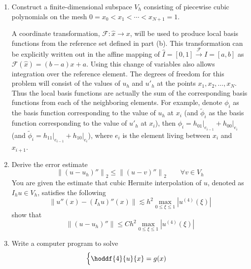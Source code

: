 \documentclass{article}
\newcommand\NoIndent[1]{%
  \begingroup
  \par
  \parshape0
  #1\par
  \endgroup
}
\begin{document}
\begin{enumerate}
\begin{enumerate}
{\begin{table}[h]
\begin{tabular}{c|c}
		\hline
		\end{tabular}
	\end{table}
}
			\item Construct a finite-dimensional subspace $V_h$ consisting of
				piecewise cubic polynomials on the mesh $0 = x_0 < x_1 < \cdots < x_{N+1} = 1$.
\NoIndent{
	A coordinate transformation, $\mathcal{F}:\hat{x}\rightarrow x$,
	will be used to produce local basis functions from the reference set defined in part (b).
	This transformation can be explicitly written out in the affine mapping of
	$\hat{I} = [0,1] \xrightarrow{\mathcal{F}} I = [a,b]$ as $\mathcal{F}(\hat{x}) = (b-a)x + a$.
	Using this change of variables also allows integration over the reference element.
	The degrees of freedom for this problem will consist of the values of $u_h$ and $u'_h$ at the points ${x_1,x_2,\dots,x_N}$.
	Thus the local basis functions are actually the sum of the corresponding basis functions from each of the neighboring elements.
	For example, denote $\phi_i$ as the basis function corresponding to the value of $u_h$ at $x_i$
	(and $\tilde{\phi}_i$ as the basis function corresponding to the value of $u'_h$ at $x_i$),
	then $\phi_i = \left.h_{01}\right|_{e_{i-1}} + \left.h_{00}\right|_{e_{i}}$
	(and $\tilde{\phi}_i = \left.h_{11}\right|_{e_{i-1}} + \left.h_{10}\right|_{e_{i}}$),
	where $e_i$ is the element living between $x_i$ and $x_{i+1}$.
}
			\item Derive the error estimate
				\begin{equation*}
					\left\|\left(u - u_h\right)''\right\|_2 \leq \left\|\left(u - v\right)''\right\|_2
						\qquad \forall v \in V_h
				\end{equation*}
				You are given the estimate that cubic Hermite interpolation of $u$,
				denoted as $I_h u \in V_h$, satisfies the following
				\begin{equation*}
					\left\|u''(x) - \left(I_h u\right)''(x)\right\| \lesssim
						h^2\max_{0\leq\xi\leq 1}\left|u^{(4)}(\xi)\right|
				\end{equation*}
				show that
				\begin{equation*}
					\left\|\left(u - u_h\right)''\right\| \leq
						Ch^2\max_{0\leq\xi\leq 1}\left|u^{(4)}(\xi)\right|
				\end{equation*}
			\item Write a computer program to solve
				\begin{equation*}
					\begin{cases}
						\displaystyle\hoddf{4}{u}{x} = g(x) \\

\end{cases}
\end{equation*}
\end{enumerate}
\end{enumerate}
\end{document}
